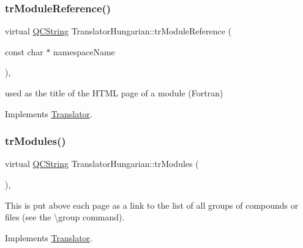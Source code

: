 \mbox{\label{class_translator_hungarian_a65cec06add4dc0e06c521f139a8fd54f}} 
\subsubsection{\texorpdfstring{trModuleReference()}{trModuleReference()}}
{\footnotesize\ttfamily virtual \mbox{\hyperlink{class_q_c_string}{Q\+C\+String}} Translator\+Hungarian\+::tr\+Module\+Reference (\begin{DoxyParamCaption}\item[{const char $\ast$}]{namespace\+Name }\end{DoxyParamCaption})\hspace{0.3cm}{\ttfamily [inline]}, {\ttfamily [virtual]}}

used as the title of the H\+T\+ML page of a module (Fortran) 

Implements \mbox{\hyperlink{class_translator}{Translator}}.

\mbox{\label{class_translator_hungarian_a5beffa65c6226de561acac17f0ce78f3}} 
\subsubsection{\texorpdfstring{trModules()}{trModules()}}
{\footnotesize\ttfamily virtual \mbox{\hyperlink{class_q_c_string}{Q\+C\+String}} Translator\+Hungarian\+::tr\+Modules (\begin{DoxyParamCaption}{ }\end{DoxyParamCaption})\hspace{0.3cm}{\ttfamily [inline]}, {\ttfamily [virtual]}}

This is put above each page as a link to the list of all groups of compounds or files (see the \textbackslash{}group command). 

Implements \mbox{\hyperlink{class_translator}{Translator}}.

\mbox{\label{class_translator_hungarian_a366243a7dde816b044f11da186125999}} 
